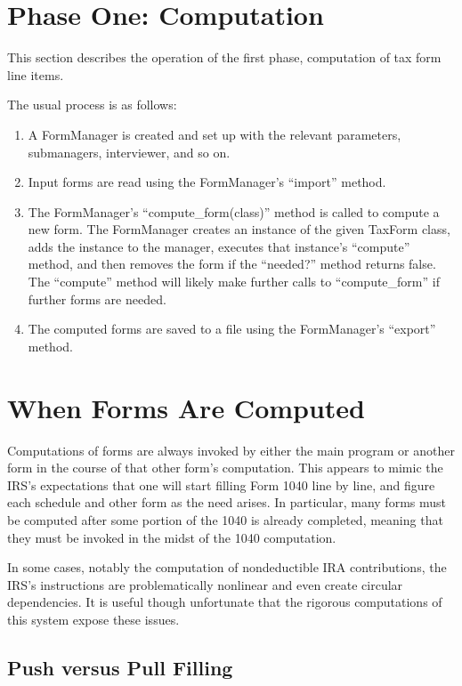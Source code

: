 \section{Phase One: Computation}

This section describes the operation of the first phase, computation of tax form
line items.

The usual process is as follows:
\begin{enumerate}
\item A FormManager is created and set up with the relevant parameters,
submanagers, interviewer, and so on.
\item Input forms are read using the FormManager's ``import'' method.
\item The FormManager's ``compute\_form(class)'' method is called to compute a
new form. The FormManager creates an instance of the given TaxForm class,
adds the instance to the manager, executes that instance's ``compute'' method,
and then removes the form if the ``needed?\@'' method returns false. The
``compute'' method will likely make further calls to ``compute\_form'' if
further forms are needed.
\item The computed forms are saved to a file using the FormManager's ``export''
method.
\end{enumerate}


\section{When Forms Are Computed}

Computations of forms are always invoked by either the main program or another
form in the course of that other form's computation. This appears to mimic the
IRS's expectations that one will start filling Form 1040 line by line, and
figure each schedule and other form as the need arises. In particular, many
forms must be computed after some portion of the 1040 is already completed,
meaning that they must be invoked in the midst of the 1040 computation.

In some cases, notably the computation of nondeductible IRA contributions, the
IRS's instructions are problematically nonlinear and even create circular
dependencies. It is useful though unfortunate that the rigorous computations of
this system expose these issues.



\subsection{Push versus Pull Filling}

